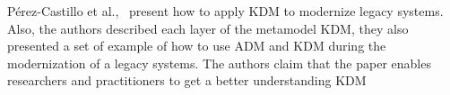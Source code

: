 P\'{e}rez-Castillo et al.,~\cite{PrezCastillo2011519, Perez-Castillo:2012:IEL:2231936.2231949, 6498507} present how to apply KDM to modernize legacy systems. Also, the authors described each layer of the metamodel KDM, they also presented a set of example of how to use ADM and KDM during the modernization of a legacy systems. The authors claim that the paper enables researchers and practitioners to get a better understanding KDM









